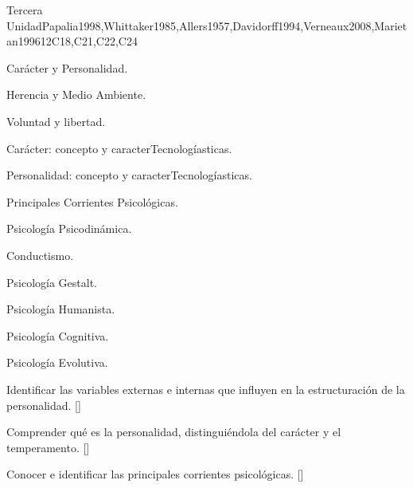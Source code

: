 \begin{syllabus}
\begin{unit}{}{Tercera Unidad}{Papalia1998,Whittaker1985,Allers1957,Davidorff1994,Verneaux2008,Marietan1996}{12}{C18,C21,C22,C24}
\begin{topics}
  \item Carácter y Personalidad.
    \begin{subtopics}
	\item Herencia y Medio Ambiente.
	\item Voluntad y libertad.
	\item Carácter: concepto y caracterTecnologíasticas.
	\item Personalidad: concepto y caracterTecnologíasticas.
    \end{subtopics}
  \item Principales Corrientes Psicológicas.
    \begin{subtopics}
	\item Psicología Psicodinámica.
	\item Conductismo.
	\item Psicología Gestalt.
	\item Psicología Humanista.
	\item Psicología Cognitiva.
	\item Psicología Evolutiva.
    \end{subtopics}
\end{topics}
\begin{learningoutcomes}
	\item Identificar las variables externas e internas que influyen en la estructuración de la personalidad. [\Familiarity]
	\item Comprender qué es la personalidad, distinguiéndola del carácter y el temperamento. [\Familiarity]
	\item Conocer e identificar las principales corrientes psicológicas. [\Familiarity]
\end{learningoutcomes}
\end{unit}



\begin{coursebibliography}
\end{coursebibliography}

\end{syllabus}
